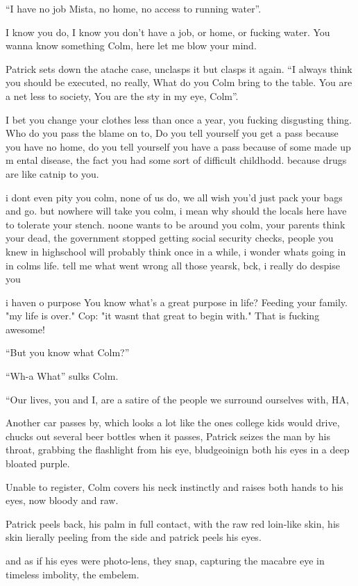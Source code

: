 \documentclass[19pt,openany]{book}
\begin{document}
``I have no job Mista, no home, no access to running water''.

I know you do, I know you don't have a job, or home, or fucking water. You wanna know something Colm, here let me blow your mind.

Patrick sets down the atache case, unclasps it but clasps it again.
``I always think you should be executed, no really, What do you
Colm bring to the table. You are a net less to society, You are the
sty in my eye, Colm''.

I bet you change your clothes less than once a year, you fucking disgusting
thing. Who do you pass the blame on to, Do you tell yourself you get a pass
because you have no home, do you tell yourself you have a pass
because of some made up m ental disease, the fact you had some sort of difficult
childhodd. because drugs are like catnip to you.


i dont even pity you colm, none of us do, we all wish you'd just pack your bags
and go. but nowhere will take you colm, i mean why should the locals
here have to tolerate your stench. noone wants to be around you colm,
your parents think your dead, the government stopped getting social
security checks, people you knew in highschool will probably think
once in a while, i wonder whats going in in colms life. tell me
what went wrong all those yearsk, bck, i really do despise you

i haven o purpose  You know what’s a great purpose in life? Feeding your family.
"my life is over." Cop: "it wasnt that great to begin with." That is fucking awesome!

``But you know what Colm?''

``Wh-a What'' sulks Colm.

``Our lives, you and I, are a satire of the people we surround ourselves with, HA,

Another car passes by, which looks a lot like the ones
college kids would drive, chucks out several beer bottles
 when it passes, Patrick
seizes the man by his throat, grabbing the flashlight from his eye,
bludgeoinign both his eyes in a deep bloated purple.

Unable to register, Colm covers his neck instinctly and raises both hands
to his eyes, now bloody and raw.

Patrick peels back, his palm in full contact, with the raw red loin-like skin,
his skin lierally peeling from the side and patrick peels his eyes.

and as if his eyes were photo-lens, they snap, capturing the macabre eye
in timeless imbolity, the embelem.
\end{document}
